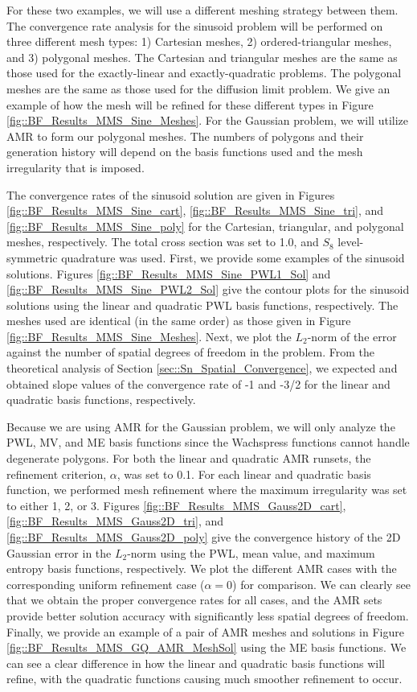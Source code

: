 For these two examples, we will use a different meshing strategy between them. The convergence rate analysis for the sinusoid problem will be performed on three different mesh types: 1) Cartesian meshes, 2) ordered-triangular meshes, and 3) polygonal meshes. The Cartesian and triangular meshes are the same as those used for the exactly-linear and exactly-quadratic problems. The polygonal meshes are the same as those used for the diffusion limit problem. We give an example of how the mesh will be refined for these different types in Figure \ref{fig::BF_Results_MMS_Sine_Meshes}. For the Gaussian problem, we will utilize AMR to form our polygonal meshes. The numbers of polygons and their generation history will depend on the basis functions used and the mesh irregularity that is imposed.

The convergence rates of the sinusoid solution are given in Figures \ref{fig::BF_Results_MMS_Sine_cart}, \ref{fig::BF_Results_MMS_Sine_tri}, and \ref{fig::BF_Results_MMS_Sine_poly} for the Cartesian, triangular, and polygonal meshes, respectively. The total cross section was set to 1.0, and $S_8$ level-symmetric quadrature was used. First, we provide some examples of the sinusoid solutions. Figures \ref{fig::BF_Results_MMS_Sine_PWL1_Sol} and \ref{fig::BF_Results_MMS_Sine_PWL2_Sol} give the contour plots for the sinusoid solutions using the linear and quadratic PWL basis functions, respectively. The meshes used are identical (in the same order) as those given in Figure \ref{fig::BF_Results_MMS_Sine_Meshes}. Next, we plot the $L_2$-norm of the error against the number of spatial degrees of freedom in the problem. From the theoretical analysis of Section \ref{sec::Sn_Spatial_Convergence}, we expected and obtained slope values of the convergence rate of -1 and -3/2 for the linear and quadratic basis functions, respectively. 

Because we are using AMR for the Gaussian problem, we will only analyze the PWL, MV, and ME basis functions since the Wachspress functions cannot handle degenerate polygons. For both the linear and quadratic AMR runsets, the refinement criterion, $\alpha$, was set to 0.1. For each linear and quadratic basis function, we performed mesh refinement where the maximum irregularity was set to either 1, 2, or 3. Figures \ref{fig::BF_Results_MMS_Gauss2D_cart}, \ref{fig::BF_Results_MMS_Gauss2D_tri}, and \ref{fig::BF_Results_MMS_Gauss2D_poly} give the convergence history of the 2D Gaussian error in the $L_2$-norm using the PWL, mean value, and maximum entropy basis functions, respectively. We plot the different AMR cases with the corresponding uniform refinement case ($\alpha=0$) for comparison. We can clearly see that we obtain the proper convergence rates for all cases, and the AMR sets provide better solution accuracy with significantly less spatial degrees of freedom. Finally, we provide an example of a pair of AMR meshes and solutions in Figure \ref{fig::BF_Results_MMS_GQ_AMR_MeshSol} using the ME basis functions. We can see a clear difference in how the linear and quadratic basis functions will refine, with the quadratic functions causing much smoother refinement to occur.

